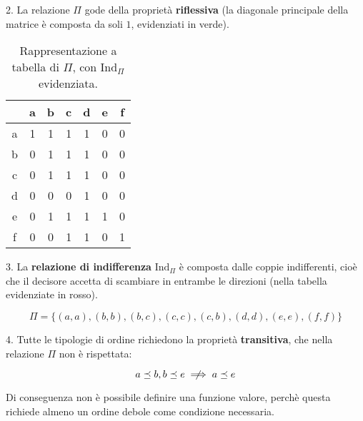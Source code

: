 \documentclass[\main/main.tex]{subfiles}
\begin{document}
2. La relazione $\Pi$ gode della proprietà \textbf{riflessiva} (la diagonale principale della matrice è composta da soli $1$, evidenziati in verde).

\begin{table}
  \begin{tabular}{|c|c|c|c|c|c|c|}
    \hline
      & a                    & b                    & c                    & d                    & e                    & f                    \\
    \hline
    a & \cellcolor{red!25} 1 & 1                    & 1                    & 1                    & 0                    & 0                    \\
    \hline
    b & 0                    & \cellcolor{red!25} 1 & \cellcolor{red!25} 1 & 1                    & 0                    & 0                    \\
    \hline
    c & 0                    & \cellcolor{red!25} 1 & \cellcolor{red!25} 1 & 1                    & 0                    & 0                    \\
    \hline
    d & 0                    & 0                    & 0                    & \cellcolor{red!25} 1 & 0                    & 0                    \\
    \hline
    e & 0                    & 1                    & 1                    & 1                    & \cellcolor{red!25} 1 & 0                    \\
    \hline
    f & 0                    & 0                    & 1                    & 1                    & 0                    & \cellcolor{red!25} 1 \\
    \hline
  \end{tabular}
  \caption{Rappresentazione a tabella di $\Pi$, con $\text{Ind}_\Pi$ evidenziata.}
\end{table}

3. La \textbf{relazione di indifferenza} $\text{Ind}_\Pi$ è composta dalle coppie indifferenti, cioè che il decisore accetta di scambiare in entrambe le direzioni (nella tabella evidenziate in rosso).

\[
  \Pi = \{(a, a), (b, b), (b,c), (c, c), (c, b), (d,d),(e,e),(f,f)\}
\]

4. Tutte le tipologie di ordine richiedono la proprietà \textbf{transitiva}, che nella relazione $\Pi$ non è rispettata:

\[
  a \preceq b, b \preceq e \centernot\implies a \preceq e
\]

Di conseguenza non è possibile definire una funzione valore, perchè questa richiede almeno un ordine debole come condizione necessaria.
\end{document}
